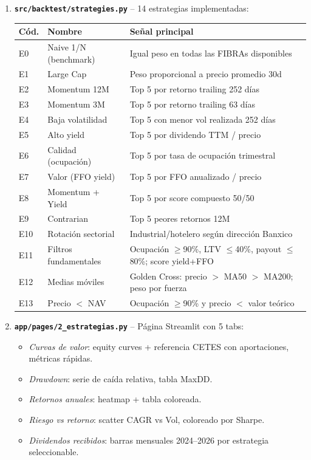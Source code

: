 \documentclass[12pt, a4paper]{article}
\begin{document}
\begin{enumerate}
  \item \textbf{\texttt{src/backtest/strategies.py}} -- 14 estrategias implementadas:
    \begin{center}
    \begin{tabular}{lll}
      \toprule
      C\'{o}d. & Nombre & Se\~{n}al principal \\
      \midrule
      E0  & Naive 1/N (benchmark)  & Igual peso en todas las FIBRAs disponibles \\
      E1  & Large Cap              & Peso proporcional a precio promedio 30d \\
      E2  & Momentum 12M           & Top 5 por retorno trailing 252 d\'{i}as \\
      E3  & Momentum 3M            & Top 5 por retorno trailing 63 d\'{i}as \\
      E4  & Baja volatilidad       & Top 5 con menor vol realizada 252 d\'{i}as \\
      E5  & Alto yield             & Top 5 por dividendo TTM / precio \\
      E6  & Calidad (ocupaci\'{o}n) & Top 5 por tasa de ocupaci\'{o}n trimestral \\
      E7  & Valor (FFO yield)      & Top 5 por FFO anualizado / precio \\
      E8  & Momentum + Yield       & Top 5 por score compuesto 50/50 \\
      E9  & Contrarian             & Top 5 peores retornos 12M \\
      E10 & Rotaci\'{o}n sectorial & Industrial/hotelero seg\'{u}n direcci\'{o}n Banxico \\
      E11 & Filtros fundamentales  & Ocupaci\'{o}n $\geq$90\%, LTV $\leq$40\%, payout $\leq$80\%; score yield+FFO \\
      E12 & Medias m\'{o}viles     & Golden Cross: precio $>$ MA50 $>$ MA200; peso por fuerza \\
      E13 & Precio $<$ NAV         & Ocupaci\'{o}n $\geq$90\% y precio $<$ valor te\'{o}rico \\
      \bottomrule
    \end{tabular}
    \end{center}

  \item \textbf{\texttt{app/pages/2\_estrategias.py}} -- P\'{a}gina Streamlit con 5 tabs:
    \begin{itemize}
      \item \textit{Curvas de valor}: equity curves + referencia CETES con aportaciones, m\'{e}tricas r\'{a}pidas.
      \item \textit{Drawdown}: serie de ca\'{i}da relativa, tabla MaxDD.
      \item \textit{Retornos anuales}: heatmap + tabla coloreada.
      \item \textit{Riesgo vs retorno}: scatter CAGR vs Vol, coloreado por Sharpe.
      \item \textit{Dividendos recibidos}: barras mensuales 2024--2026 por estrategia seleccionable.
    \end{itemize}


\end{enumerate}
\end{document}
